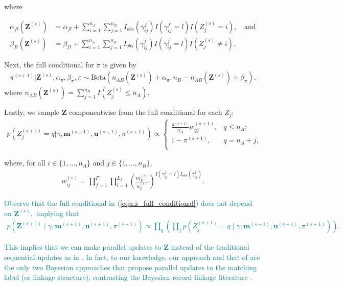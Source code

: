 \documentclass[ba]{imsart}
\begin{document}
where

\begin{align}
\alpha_{fl}(\bm{Z}^{(s)})&= \alpha_{fl} + \sum_{i=1}^{n_A}\sum_{j=1}^{n_B} I_{obs}(\gamma_{ij}^f) I(\gamma_{ij}^f = l) I(Z_j^{(s)} = i), \label{eqn:alpha_update} \quad \text{and}\\
\beta_{fl}(\bm{Z}^{(s)})&=  \beta_{fl} + \sum_{i=1}^{n_A}\sum_{j=1}^{n_B}  I_{obs}(\gamma_{ij}^f) I(\gamma_{ij}^f = l) I(Z_j^{(s)} \neq i) \label{eqn:beta_update}.
\end{align}	


Next, the full conditional for $\pi$ is given by
\begin{align}
\label{eqn:pi}
	\pi^{(s+1)}|\bm{Z}^{(s)},  \alpha_{\pi}, \beta_{\pi}, \pi \sim  \text{Beta}(n_{AB}(\bm{Z}^{(s)}) + \alpha_{\pi}, n_B - n_{AB}(\bm{Z}^{(s)}) + \beta_{\pi}).
\end{align}
where $n_{AB}(\bm{Z}^{(s)}) = \sum_{j=1}^{n_B} I(Z_j^{(s)} \leq n_A)$.

Lastly, we sample $\bm{Z}$ componentwise from the full conditional for each $Z_j$:
\begin{align}
	\label{eqn:z_full_conditional}
	p\left(Z_j^{(s+1)}  = q|\gamma, \bm{m}^{(s+1)}, \bm{u}^{(s+1)},  \pi^{(s+1)}\right) \propto
	\begin{cases} 
		\frac{\pi^{(s+1)}}{n_A} w_{qj}^{(s+1)},  & q \leq n_A; \\
		1 - \pi^{(s+1)}, & q  = n_A + j, \\
	\end{cases}
\end{align}

where, for all $i \in \{1, \ldots, n_A\}$ and $j \in \{1, \ldots, n_B\}$, 
\begin{align}
	\label{eqn:fs_weight}
	w_{ij}^{(s)} = \prod_{f=1}^{F}\prod_{l = 1}^{L_f} \left(\frac{m_{fl}^{(s)}}{u_{fl}^{(s)}}\right)^{I(\gamma_{ij}^f = l)I_{obs}(\gamma_{ij}^f)}.
\end{align}

\textcolor{teal}{
Observe that the full conditional in (\ref{eqn:z_full_conditional}) does not depend on $\bm{Z}^{(s)},$ implying that 
\begin{align}
p(\bm{Z}^{(s+1)} \mid \gamma, \bm{m}^{(s+1)}, \bm{u}^{(s+1)}, \pi^{(s+1)}) \propto \prod_q \left(\prod_j
p\left(Z_j^{(s+1)}  = q \mid \gamma, \bm{m}^{(s+1)}, \bm{u}^{(s+1)}, \pi^{(s+1)} \right)
\right).
\end{align}
}

\textcolor{teal}{This implies that we can make parallel updates to $\bm{Z}$ instead of the traditional sequential updates as in \cite{sadinle_bayesian_2017}.
In fact, to our knowledge, our approach and that of \cite{wortman2019} are the only two Bayesian approaches that propose parallel updates to the matching label (or linkage structure), contrasting the Bayesian record linkage literature \citep{tancredi2011hierarchical, sadinle_detecting_2014, steorts_bayesian_2016, marchant_distributed_2019, zanella_flexible_2016, betancourt2022prior, aleshinguendel2021multifile}. }
\end{document}
